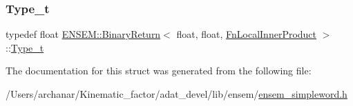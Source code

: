 \mbox{\label{structENSEM_1_1BinaryReturn_3_01float_00_01float_00_01FnLocalInnerProduct_01_4_ad3f2d521df09966c47e84ff9e4dc2a95}} 
\subsubsection{\texorpdfstring{Type\_t}{Type\_t}\hspace{0.1cm}{\footnotesize\ttfamily [2/2]}}
{\footnotesize\ttfamily typedef float \mbox{\hyperlink{structENSEM_1_1BinaryReturn}{E\+N\+S\+E\+M\+::\+Binary\+Return}}$<$ float, float, \mbox{\hyperlink{structENSEM_1_1FnLocalInnerProduct}{Fn\+Local\+Inner\+Product}} $>$\+::\mbox{\hyperlink{structENSEM_1_1BinaryReturn_3_01float_00_01float_00_01FnLocalInnerProduct_01_4_ad3f2d521df09966c47e84ff9e4dc2a95}{Type\+\_\+t}}}



The documentation for this struct was generated from the following file\+:\begin{DoxyCompactItemize}
\item 
/\+Users/archanar/\+Kinematic\+\_\+factor/adat\+\_\+devel/lib/ensem/\mbox{\hyperlink{lib_2ensem_2ensem__simpleword_8h}{ensem\+\_\+simpleword.\+h}}\end{DoxyCompactItemize}
